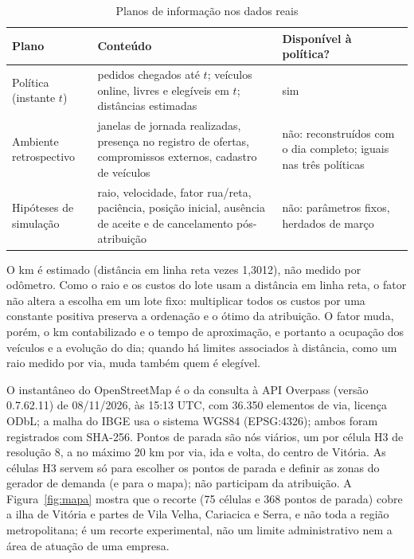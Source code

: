 \begin{table}[!htb]
\caption{Planos de informação nos dados reais}\label{tab:info}
\centering\fontetabela
\begin{tabular}{|p{34mm}|p{62mm}|p{52mm}|}
\hline
\textbf{Plano} & \textbf{Conteúdo} & \textbf{Disponível à política?} \\
\hline
Política (instante $t$) & pedidos chegados até $t$; veículos online, livres e elegíveis em $t$; distâncias estimadas & sim \\
\hline
Ambiente retrospectivo & janelas de jornada realizadas, presença no registro de ofertas, compromissos externos, cadastro de veículos & não: reconstruídos com o dia completo; iguais nas três políticas \\
\hline
Hipóteses de simulação & raio, velocidade, fator rua/reta, paciência, posição inicial, ausência de aceite e de cancelamento pós-atribuição & não: parâmetros fixos, herdados de março \\
\hline
\end{tabular}
\end{table}


O km é estimado (distância em linha reta vezes 1,3012), não medido por odômetro. Como o raio e os custos do lote usam a distância em linha reta, o fator não altera a escolha em um lote fixo: multiplicar todos os custos por uma constante positiva preserva a ordenação e o ótimo da atribuição. O fator muda, porém, o km contabilizado e o tempo de aproximação, e portanto a ocupação dos veículos e a evolução do dia; quando há limites associados à distância, como um raio medido por via, muda também quem é elegível.


O instantâneo do OpenStreetMap é o da consulta à API Overpass (versão 0.7.62.11) de 08/11/2026, às 15:13 UTC, com 36.350 elementos de via, licença ODbL; a malha do IBGE usa o sistema WGS84 (EPSG:4326); ambos foram registrados com SHA-256. Pontos de parada são nós viários, um por célula H3 de resolução 8, a no máximo 20 km por via, ida e volta, do centro de Vitória. As células H3 servem só para escolher os pontos de parada e definir as zonas do gerador de demanda (e para o mapa); não participam da atribuição. A Figura~\ref{fig:mapa} mostra que o recorte (75 células e 368 pontos de parada) cobre a ilha de Vitória e partes de Vila Velha, Cariacica e Serra, e não toda a região metropolitana; é um recorte experimental, não um limite administrativo nem a área de atuação de uma empresa.

